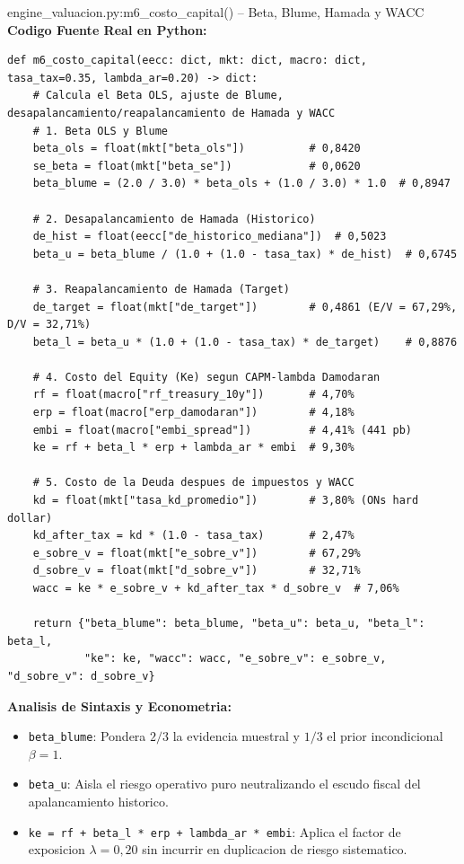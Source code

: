 \documentclass[10pt,a4paper]{article}
\theoremstyle{definition}
\begin{document}
\begin{codebox}{{engine\_valuacion.py:m6\_costo\_capital() -- Beta, Blume, Hamada y WACC}}
\textbf{Codigo Fuente Real en Python:}
\begin{verbatim}
def m6_costo_capital(eecc: dict, mkt: dict, macro: dict, tasa_tax=0.35, lambda_ar=0.20) -> dict:
    # Calcula el Beta OLS, ajuste de Blume, desapalancamiento/reapalancamiento de Hamada y WACC
    # 1. Beta OLS y Blume
    beta_ols = float(mkt["beta_ols"])          # 0,8420
    se_beta = float(mkt["beta_se"])            # 0,0620
    beta_blume = (2.0 / 3.0) * beta_ols + (1.0 / 3.0) * 1.0  # 0,8947
    
    # 2. Desapalancamiento de Hamada (Historico)
    de_hist = float(eecc["de_historico_mediana"])  # 0,5023
    beta_u = beta_blume / (1.0 + (1.0 - tasa_tax) * de_hist)  # 0,6745
    
    # 3. Reapalancamiento de Hamada (Target)
    de_target = float(mkt["de_target"])        # 0,4861 (E/V = 67,29%, D/V = 32,71%)
    beta_l = beta_u * (1.0 + (1.0 - tasa_tax) * de_target)    # 0,8876
    
    # 4. Costo del Equity (Ke) segun CAPM-lambda Damodaran
    rf = float(macro["rf_treasury_10y"])       # 4,70%
    erp = float(macro["erp_damodaran"])        # 4,18%
    embi = float(macro["embi_spread"])         # 4,41% (441 pb)
    ke = rf + beta_l * erp + lambda_ar * embi  # 9,30%
    
    # 5. Costo de la Deuda despues de impuestos y WACC
    kd = float(mkt["tasa_kd_promedio"])        # 3,80% (ONs hard dollar)
    kd_after_tax = kd * (1.0 - tasa_tax)       # 2,47%
    e_sobre_v = float(mkt["e_sobre_v"])        # 67,29%
    d_sobre_v = float(mkt["d_sobre_v"])        # 32,71%
    wacc = ke * e_sobre_v + kd_after_tax * d_sobre_v  # 7,06%
    
    return {"beta_blume": beta_blume, "beta_u": beta_u, "beta_l": beta_l,
            "ke": ke, "wacc": wacc, "e_sobre_v": e_sobre_v, "d_sobre_v": d_sobre_v}
\end{verbatim}
\textbf{Analisis de Sintaxis y Econometria:}
\begin{itemize}
    \item \texttt{beta\_blume}: Pondera $2/3$ la evidencia muestral y $1/3$ el prior incondicional $\beta = 1$.
    \item \texttt{beta\_u}: Aisla el riesgo operativo puro neutralizando el escudo fiscal del apalancamiento historico.
    \item \texttt{ke = rf + beta\_l * erp + lambda\_ar * embi}: Aplica el factor de exposicion $\lambda = 0,20$ sin incurrir en duplicacion de riesgo sistematico.
\end{itemize}
\end{codebox}
\clearpage
\end{document}
